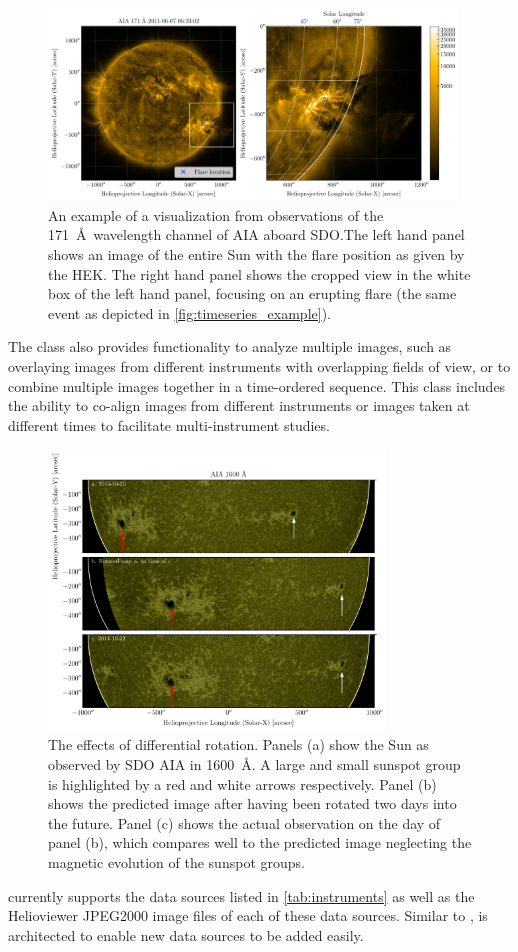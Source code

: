 \begin{figure}
    \centering
    \includegraphics[width=0.97\textwidth]{figures/map_example.pdf}
    \caption{An example of a \Map visualization from observations of the 171~\AA\ wavelength channel of AIA aboard SDO.The left hand panel shows an image of the entire Sun with the flare position as given by the HEK. The right hand panel shows the cropped view in the white box of the left hand panel, focusing on an erupting flare (the same event as depicted in \autoref{fig:timeseries_example}).}
    \label{fig:map_example}
\end{figure}

The \Map class also provides functionality to analyze multiple images, such as overlaying images from different instruments with overlapping fields of view, or to combine multiple images together in a time-ordered sequence.
This class includes the ability to co-align images from different instruments or images taken at different times to facilitate multi-instrument studies.


\begin{figure}
    \center
    \includegraphics[width = 0.8\textwidth]{figures/fig_diff_rot_1600.pdf}
    \caption{The effects of differential rotation.
    Panels (a) show the Sun as observed by SDO AIA in 1600~\AA{}.
    A large and small sunspot group is highlighted by a red and white arrows respectively.
    Panel (b) shows the predicted image after having been rotated two days into the future.
    Panel (c) shows the actual observation on the day of panel (b), which compares well to the predicted image neglecting the magnetic evolution of the sunspot groups.}
    \label{fig:diff_rot}
\end{figure}

\Map currently supports the data sources listed in \autoref{tab:instruments} as well as the Helioviewer JPEG2000 image files of  each of these data sources.
Similar to \Timeseries, \Map is architected to enable new data sources to be added easily.
